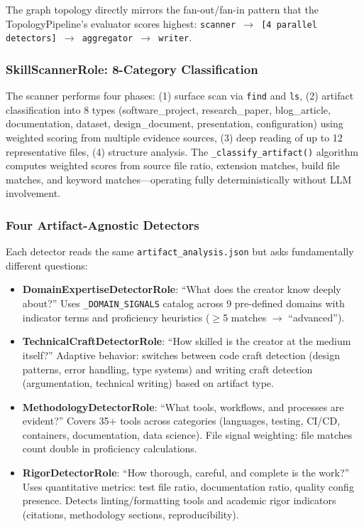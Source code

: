 The graph topology directly mirrors the fan-out/fan-in pattern \cite{aflow} that the TopologyPipeline's evaluator scores highest: \texttt{scanner $\rightarrow$ [4 parallel detectors] $\rightarrow$ aggregator $\rightarrow$ writer}.

\subsubsection{SkillScannerRole: 8-Category Classification}

The scanner performs four phases: (1) surface scan via \texttt{find} and \texttt{ls}, (2) artifact classification into 8 types (software\_project, research\_paper, blog\_article, documentation, dataset, design\_document, presentation, configuration) using weighted scoring from multiple evidence sources, (3) deep reading of up to 12 representative files, (4) structure analysis. The \texttt{\_classify\_artifact()} algorithm computes weighted scores from source file ratio, extension matches, build file matches, and keyword matches---operating fully deterministically without LLM involvement.

\subsubsection{Four Artifact-Agnostic Detectors}

Each detector reads the same \texttt{artifact\_analysis.json} but asks fundamentally different questions:

\begin{itemize}
    \item \textbf{DomainExpertiseDetectorRole}: ``What does the creator know deeply about?'' Uses \texttt{\_DOMAIN\_SIGNALS} catalog across 9 pre-defined domains with indicator terms and proficiency heuristics ($\ge$5 matches $\rightarrow$ ``advanced'').

    \item \textbf{TechnicalCraftDetectorRole}: ``How skilled is the creator at the medium itself?'' Adaptive behavior: switches between code craft detection (design patterns, error handling, type systems) and writing craft detection (argumentation, technical writing) based on artifact type.

    \item \textbf{MethodologyDetectorRole}: ``What tools, workflows, and processes are evident?'' \cite{wirl,stride} Covers 35+ tools across categories (languages, testing, CI/CD, containers, documentation, data science). File signal weighting: file matches count double in proficiency calculations.

    \item \textbf{RigorDetectorRole}: ``How thorough, careful, and complete is the work?'' Uses quantitative metrics: test file ratio, documentation ratio, quality config presence. Detects linting/formatting tools and academic rigor indicators (citations, methodology sections, reproducibility).
\end{itemize}

